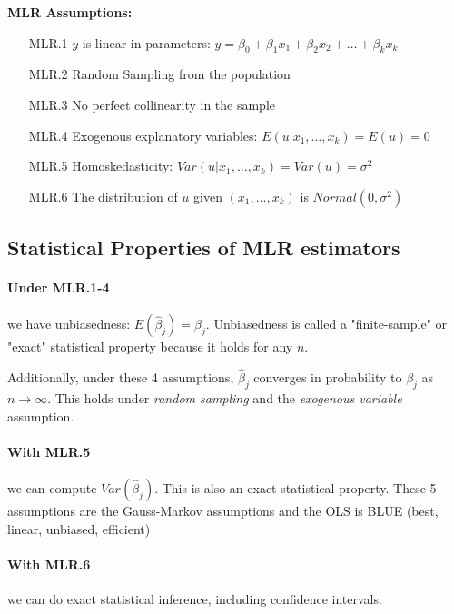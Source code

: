 \documentclass[11pt]{article}
\begin{document}
\begin{shaded}
\textbf{MLR Assumptions:}
\begin{center}
\begin{varwidth}{\textwidth}
        \begin{enumerate}
        \item [MLR.1] $y$ is linear in parameters: $y = \beta_0 + \beta_1 x_1 + \beta_2 x_2 + \ldots + \beta_k x_k$
        \item [MLR.2] Random Sampling from the population
        \item [MLR.3] No perfect collinearity in the sample
        \item [MLR.4] Exogenous explanatory variables: $E(u|x_1, \ldots, x_k) = E(u) = 0$
        \item [MLR.5] Homoskedasticity: $Var(u|x_1,\ldots, x_k) = Var(u) = \sigma^2$
        \item [MLR.6] The distribution of $u$ given $(x_1, \ldots, x_k)$ is $Normal(0, \sigma^2)$
    \end{enumerate}
\end{varwidth}
\end{center}
\end{shaded}

\subsection{Statistical Properties of MLR estimators}

\paragraph{Under MLR.1-4} we have unbiasedness: $E(\hat{\beta}_j) = \beta_j$. Unbiasedness is called a "finite-sample" or "exact" statistical property because it holds for any $n$. 

Additionally, under these 4 assumptions, $\hat{\beta}_j$ converges in probability to $\beta_j$ as $n\rightarrow \infty$. This holds under \textit{random sampling} and the \textit{exogenous variable} assumption. 

\paragraph{With MLR.5} we can compute $Var(\hat{\beta}_j)$. This is also an exact statistical property. These 5 assumptions are the Gauss-Markov assumptions and the OLS is BLUE (best, linear, unbiased, efficient)

\paragraph{With MLR.6} we can do exact statistical inference, including confidence intervals.
\end{document}
